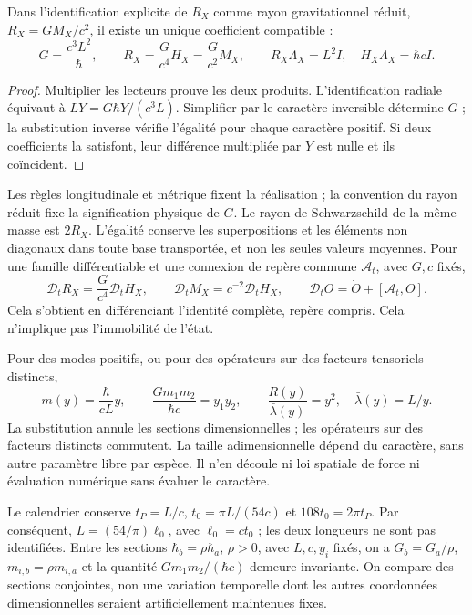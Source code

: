 \begin{proposition}
\label{hmtcuatro:gea:coeficiente} Dans l’identification explicite de $R_X$ comme rayon gravitationnel réduit, $R_X=GM_X/c^2$, il existe un unique coefficient compatible :
\begin{equation}
G=\frac{c^3L^2}{\hbar},\qquad
R_X=\frac{G}{c^4}H_X=\frac{G}{c^2}M_X,\qquad
R_X\Lambda_X=L^2I,\quad H_X\Lambda_X=\hbar cI.
\label{hmtcuatro:gea:radial}
\end{equation}
\end{proposition}
\begin{proof}
Multiplier les lecteurs prouve les deux produits. L’identification radiale équivaut à $LY=G\hbar Y/(c^3L)$. Simplifier par le caractère inversible détermine $G$ ; la substitution inverse vérifie l’égalité pour chaque caractère positif. Si deux coefficients la satisfont, leur différence multipliée par $Y$ est nulle et ils coïncident.
\end{proof}

Les règles longitudinale et métrique fixent la réalisation ; la convention du rayon réduit fixe la signification physique de $G$. Le rayon de Schwarzschild de la même masse est $2R_X$. L’égalité conserve les superpositions et les éléments non diagonaux dans toute base transportée, et non les seules valeurs moyennes. Pour une famille différentiable et une connexion de repère commune $\mathcal A_t$, avec $G,c$ fixés,
\begin{equation}
\mathcal D_tR_X=\frac{G}{c^4}\mathcal D_tH_X,\qquad
\mathcal D_tM_X=c^{-2}\mathcal D_tH_X,\qquad
\mathcal D_tO=\dot O+[\mathcal A_t,O].
\label{hmtcuatro:gea:derivada}
\end{equation}
Cela s’obtient en différenciant l’identité complète, repère compris. Cela n’implique pas l’immobilité de l’état.

Pour des modes positifs, ou pour des opérateurs sur des facteurs tensoriels distincts,
\begin{equation}
m(y)=\frac{\hbar}{cL}y,\qquad
\frac{Gm_1m_2}{\hbar c}=y_1y_2,\qquad
\frac{R(y)}{\bar\lambda(y)}=y^2,\quad \bar\lambda(y)=L/y.
\label{hmtcuatro:gea:adimensional}
\end{equation}
La substitution annule les sections dimensionnelles ; les opérateurs sur des facteurs distincts commutent. La taille adimensionnelle dépend du caractère, sans autre paramètre libre par espèce. Il n’en découle ni loi spatiale de force ni évaluation numérique sans évaluer le caractère.

Le calendrier conserve $t_P=L/c$, $t_0=\pi L/(54c)$ et $108t_0=2\pi t_P$. Par conséquent, $L=(54/\pi)\ell_0$, avec $\ell_0=ct_0$ ; les deux longueurs ne sont pas identifiées. Entre les sections $\hbar_b=\rho\hbar_a$, $\rho>0$, avec $L,c,y_i$ fixés, on a $G_b=G_a/\rho$, $m_{i,b}=\rho m_{i,a}$ et la quantité $Gm_1m_2/(\hbar c)$ demeure invariante. On compare des sections conjointes, non une variation temporelle dont les autres coordonnées dimensionnelles seraient artificiellement maintenues fixes.


